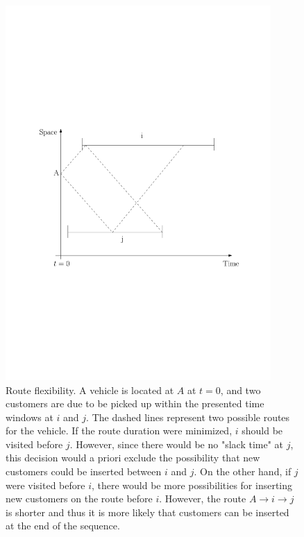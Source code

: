 \documentclass[dissertation,draft*]{aaltoseries}
\begin{document}
\begin{figure}[ht]
\begin{center}
\includegraphics[width=0.9\textwidth]{flexibility03.pdf}
\caption{Route flexibility. A vehicle is located at $A$ at $t = 0$,
and two customers are due to be picked up within the presented time windows at $i$ and $j$.
The dashed lines represent two possible routes for the vehicle.
If the route duration were minimized, $i$ should be visited before $j$. However, since
there would be no "slack time" at $j$, this decision would a priori 
exclude the possibility that new customers could be inserted between $i$ and $j$. 
On the other hand, if $j$ were visited before $i$, there would be
more possibilities for inserting new customers on the route before $i$. However, 
the route $A \to i \to j$ is shorter and thus it is more likely that 
customers can be inserted at the end of the sequence.}
\label{flexibility01}
\end{center}
\end{figure}
\end{document}
